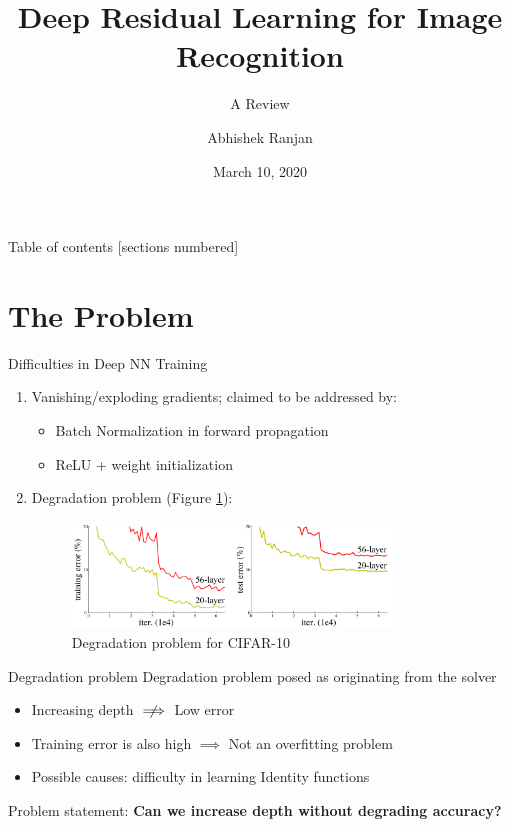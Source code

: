\documentclass[10pt]{beamer}
\title{Deep Residual Learning for Image Recognition}
\subtitle{A Review}
\date{March 10, 2020}
\author{Abhishek Ranjan}
\institute{Toronto, ON}
\begin{document}
\maketitle

\begin{frame}{Table of contents}
  [sections numbered]
  \tableofcontents [hideallsubsections]
\end{frame}

\section{The Problem}
	\begin{frame}[fragile]{Difficulties in Deep NN Training}
		\begin{enumerate}
			\item Vanishing/exploding gradients; claimed to be addressed by:
			\begin{itemize}
				\item Batch Normalization in forward propagation
				\item ReLU + weight initialization
			\end{itemize}
			\item Degradation problem (Figure \ref{fig-degradation}):
				\begin{figure}
					\centering
					\includegraphics[width=0.8\textwidth]{degradation-problem.png}
					\caption{Degradation problem for CIFAR-10}
					\label{fig-degradation}
				\end{figure}
		\end{enumerate}
	\end{frame}

	\begin{frame}[fragile]{Degradation problem}
		Degradation problem posed as originating from the solver 
		\begin{itemize}
			\item Increasing depth $\centernot\implies$ Low error
			\item Training error is also high $\implies$ Not an overfitting problem
			\item Possible causes: difficulty in learning Identity functions
		\end{itemize}
	Problem statement: \textbf{Can we increase depth without degrading accuracy?} \cite{resnet_he2016}
	\end{frame}
\end{document}
